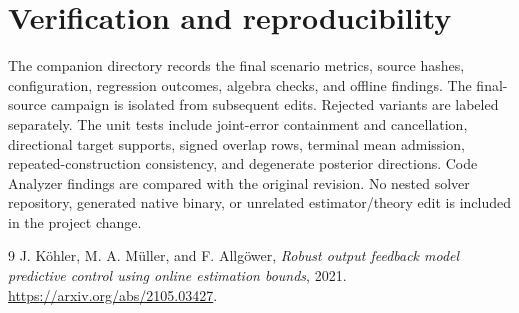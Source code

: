 \documentclass[11pt]{article}
\begin{document}
\section{Verification and reproducibility}
The companion directory records the final scenario metrics, source hashes,
configuration, regression outcomes, algebra checks, and offline findings.
The final-source campaign is isolated from subsequent edits. Rejected
variants are labeled separately. The unit tests include joint-error
containment and cancellation, directional target supports, signed overlap
rows, terminal mean admission, repeated-construction consistency, and
degenerate posterior directions. Code Analyzer findings are compared with
the original revision. No nested solver repository, generated native binary,
or unrelated estimator/theory edit is included in the project change.

\begin{thebibliography}{9}
 J. K\"ohler, M. A. M\"uller, and F. Allg\"ower,
\emph{Robust output feedback model predictive control using online estimation
bounds}, 2021. \url{https://arxiv.org/abs/2105.03427}.
\end{thebibliography}
\end{document}
